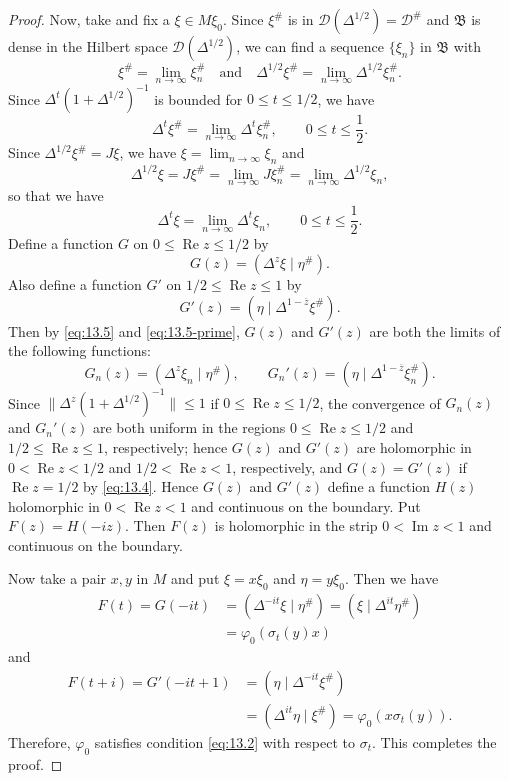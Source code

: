 \documentclass[12pt,b5paper,twoside]{article}
\theoremstyle{takesaki}
\numberwithin{equation}{section}
\begin{document}
\begin{proof}
Now, take and fix a $\xi\in M\xi_0$.  Since $\xi^{\#}$ is in
$\mathcal D(\Delta^{1/2})=\mathcal D^{\#}$ and $\mathfrak B$ is dense
in the Hilbert space $\mathcal D(\Delta^{1/2})$, we can find a
sequence $\{\xi_n\}$ in $\mathfrak B$ with
\[
 \xi^{\#}=\lim_{n\to\infty}\xi_n^{\#}
 \quad\text{and}\quad
 \Delta^{1/2}\xi^{\#}
 =\lim_{n\to\infty}\Delta^{1/2}\xi_n^{\#}.
\]
Since $\Delta^t(1+\Delta^{1/2})^{-1}$ is bounded for
$0\leq t\leq1/2$, we have
\begin{equation}
 \Delta^t\xi^{\#}
 =\lim_{n\to\infty}\Delta^t\xi_n^{\#},
 \qquad 0\leq t\leq\frac12.
 \tag{13.5}\label{eq:13.5}
\end{equation}
Since $\Delta^{1/2}\xi^{\#}=J\xi$, we have
$\xi=\lim_{n\to\infty}\xi_n$ and
\[
 \Delta^{1/2}\xi=J\xi^{\#}
 =\lim_{n\to\infty}J\xi_n^{\#}
 =\lim_{n\to\infty}\Delta^{1/2}\xi_n,
\]
so that we have
\begin{equation}
 \Delta^t\xi=\lim_{n\to\infty}\Delta^t\xi_n,
 \qquad 0\leq t\leq\frac12.
 \tag{13.5$'$}\label{eq:13.5-prime}
\end{equation}
Define a function $G$ on $0\leq\operatorname{Re}z\leq1/2$ by
\[
  G(z)=(\Delta^z\xi\mid\eta^{\#}).
\]
Also define a function $G'$ on $1/2\leq\operatorname{Re}z\leq1$ by
\[
  G'(z)=(\eta\mid\Delta^{1-\overline z}\xi^{\#}).
\]
Then by \eqref{eq:13.5} and \eqref{eq:13.5-prime}, $G(z)$ and
$G'(z)$ are both the limits of the following functions:
\[
 G_n(z)=(\Delta^z\xi_n\mid\eta^{\#}),
 \qquad
 G_n'(z)=(\eta\mid\Delta^{1-\overline z}\xi_n^{\#}).
\]
Since
$\|\Delta^z(1+\Delta^{1/2})^{-1}\|\leq1$ if
$0\leq\operatorname{Re}z\leq1/2$, the convergence of $G_n(z)$
and $G_n'(z)$ are both uniform in the regions
$0\leq\operatorname{Re}z\leq1/2$ and
$1/2\leq\operatorname{Re}z\leq1$, respectively; hence $G(z)$ and
$G'(z)$ are holomorphic in $0<\operatorname{Re}z<1/2$ and
$1/2<\operatorname{Re}z<1$, respectively, and $G(z)=G'(z)$ if
$\operatorname{Re}z=1/2$ by \eqref{eq:13.4}.  Hence $G(z)$ and
$G'(z)$ define a function $H(z)$ holomorphic in
$0<\operatorname{Re}z<1$ and continuous on the boundary.  Put
$F(z)=H(-iz)$.  Then $F(z)$ is holomorphic in the strip
$0<\operatorname{Im}z<1$ and continuous on the boundary.

Now take a pair $x,y$ in $M$ and put $\xi=x\xi_0$ and
$\eta=y\xi_0$.  Then we have
\begin{align*}
 F(t)=G(-it)
 &=(\Delta^{-it}\xi\mid\eta^{\#})
   =(\xi\mid\Delta^{it}\eta^{\#})\\
 &=\varphi_0(\sigma_t(y)x)
\end{align*}
and
\begin{align*}
 F(t+i)=G'(-it+1)
 &=(\eta\mid\Delta^{-it}\xi^{\#})\\
 &=(\Delta^{it}\eta\mid\xi^{\#})
   =\varphi_0(x\sigma_t(y)).
\end{align*}
Therefore, $\varphi_0$ satisfies condition \eqref{eq:13.2} with
respect to $\sigma_t$.  This completes the proof.
\end{proof}
\end{document}
